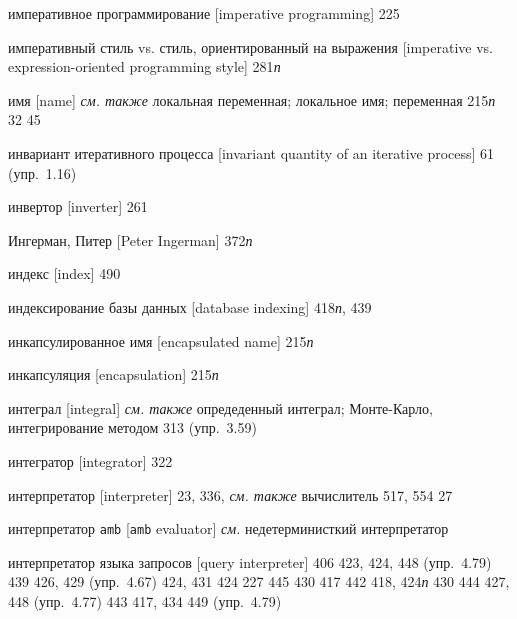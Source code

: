 \begin{theindex}
\item {императивное программирование [imperative programming]} 225
\item {императивный стиль vs. стиль, ориентированный на выражения [imperative vs. expression-oriented programming style]} 281{\it п}
\item {имя [name]} {\it см. также} локальная переменная; локальное имя; переменная
   215{\it п}
   32
   45
\item {инвариант итеративного процесса [invariant quantity of an iterative process]} 61 (упр.~1.16)
\item {инвертор [inverter]} 261
\item {Ингерман, Питер [Peter Ingerman]} 372{\it п}
\item {индекс [index]} 490
\item {индексирование базы данных [database indexing]} 418{\it п}, 439
\item {инкапсулированное имя [encapsulated name]} 215{\it п}
\item {инкапсуляция [encapsulation]} 215{\it п}
\item {интеграл [integral]} {\it см. также} опредеденный интеграл; Монте-Карло, интегрирование методом
   313 (упр.~3.59)
\item {интегратор [integrator]} 322
\item {интерпретатор [interpreter]} 23, 336, {\it см. также} вычислитель
   517, 554
   27
\item {интерпретатор \texttt{amb} [{\tt amb} evaluator]} {\it см.} недетерминисткий интерпретатор
\item {интерпретатор языка запросов [query interpreter]} 406
   423, 424, 448 (упр.~4.79)
   439
   426, 429 (упр.~4.67)
   424, 431
   424
   227
   445
   430
   417
   442
   418, 424{\it п}
   430
   444
   427, 448 (упр.~4.77)
   443
   417, 434
   449 (упр.~4.79)

\end{theindex}
